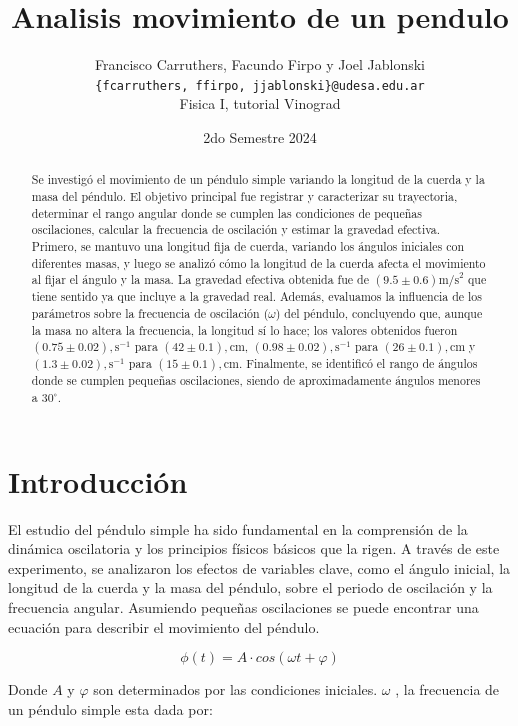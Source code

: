 \documentclass[12pt,a4]{article}
\title{Analisis movimiento de un pendulo}
\author{Francisco Carruthers, Facundo Firpo y Joel Jablonski\\ [2mm]
\small \texttt{\{fcarruthers, ffirpo, jjablonski\}@udesa.edu.ar}\\
\small Fisica I, tutorial Vinograd}
\date{2do Semestre 2024}
\begin{document}
\maketitle

\begin{abstract}
    Se investigó el movimiento de un péndulo simple variando la longitud de la cuerda y la masa del péndulo. El objetivo principal fue registrar y caracterizar su trayectoria, determinar el rango angular donde se cumplen las condiciones de pequeñas oscilaciones, calcular la frecuencia de oscilación y estimar la gravedad efectiva. Primero, se mantuvo una longitud fija de cuerda, variando los ángulos iniciales con diferentes masas, y luego se analizó cómo la longitud de la cuerda afecta el movimiento al fijar el ángulo y la masa. La gravedad efectiva obtenida fue de $(9.5 \pm 0.6) \text{m/s}^2$ que tiene sentido ya que incluye a la gravedad real. Además, evaluamos la influencia de los parámetros sobre la frecuencia de oscilación ($\omega$) del péndulo, concluyendo que, aunque la masa no altera la frecuencia, la longitud sí lo hace; los valores obtenidos fueron \((0.75 \pm 0.02), \text{s}^{-1}\) para \((42 \pm 0.1), \text{cm}\), \((0.98 \pm 0.02), \text{s}^{-1}\) para \((26 \pm 0.1), \text{cm}\) y \((1.3 \pm 0.02), \text{s}^{-1}\) para \((15 \pm 0.1), \text{cm}\). Finalmente, se identificó el rango de ángulos donde se cumplen pequeñas oscilaciones, siendo de aproximadamente ángulos menores a $30^\circ$.

\end{abstract}

\section{Introducción}

El estudio del péndulo simple ha sido fundamental en la comprensión de la dinámica oscilatoria y los principios físicos básicos que la rigen. A través de este experimento, se analizaron los efectos de variables clave, como el ángulo inicial, la longitud de la cuerda y la masa del péndulo, sobre el periodo de oscilación y la frecuencia angular. Asumiendo pequeñas oscilaciones se puede encontrar una ecuación para describir el movimiento del péndulo.

\begin{equation}
    \phi(t) = A \cdot cos(\omega t + \varphi)
\end{equation}

Donde $A$ y $\varphi$ son determinados por las condiciones iniciales. $\omega$ , la frecuencia de un péndulo simple esta dada por:
\end{document}
